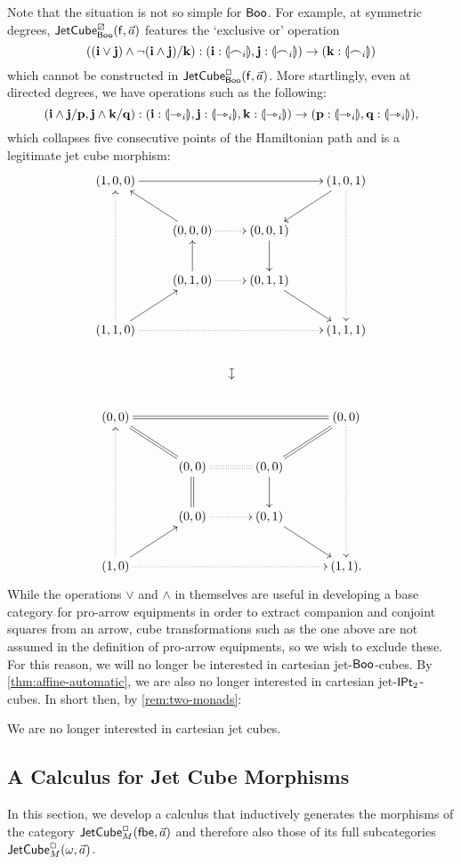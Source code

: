 \documentclass[a4paper]{memoir}
\begin{document}
Note that the situation is not so simple for $\mathsf{Boo}$.
For example, at symmetric degrees, $\mathsf{JetCube}^{\boxslash}_{\mathsf{Boo}}\mathopen{}\left( {\mathsf{f}},\vec a \right)\mathclose{}$ features the `exclusive or' operation
\[
	((\mathbf{i} \vee \mathbf{j}) \wedge \lnot(\mathbf{i} \wedge \mathbf{j})/\mathbf{k}) : (\mathbf{i} : {\llparenthesis \frown_i \rrparenthesis}, \mathbf{j} : {\llparenthesis \frown_i \rrparenthesis}) \to (\mathbf{k} : {\llparenthesis \frown_i \rrparenthesis})
\]
which cannot be constructed in $\mathsf{JetCube}^{\Box}_{\mathsf{Boo}}\mathopen{}\left( {\mathsf{f}},\vec a \right)\mathclose{}$.
More startlingly, even at directed degrees, we have operations such as the following:
\[
	(\mathbf{i} \wedge \mathbf{j}/\mathbf{p}, \mathbf{j} \wedge \mathbf{k}/\mathbf{q}) : (\mathbf{i} : {\llparenthesis \rightarrowtriangle_i \rrparenthesis}, \mathbf{j} : {\llparenthesis \rightarrowtriangle_i \rrparenthesis}, \mathbf{k} : {\llparenthesis \rightarrowtriangle_i \rrparenthesis}) \to (\mathbf{p} : {\llparenthesis \rightarrowtriangle_i \rrparenthesis}, \mathbf{q} : {\llparenthesis \rightarrowtriangle_i \rrparenthesis}),
\]
which collapses five consecutive points of the Hamiltonian path and is a legitimate jet cube morphism:
\[
	\xymatrix{
		(1, 0, 0)
			\ar[rrr]
		&&& (1, 0, 1)
			\ar[ld]
			\ar@{.>}[ddd]
		\\
		& (0, 0, 0)
			\ar[lu]
			\ar@{.>}[r]
		& (0, 0, 1)
			\ar[d]
		\\
		& (0, 1, 0)
			\ar[u]
			\ar@{.>}[r]
		& (0, 1, 1)
			\ar[rd]
		\\
		(1, 1, 0)
			\ar[ru]
			\ar@{.>}[uuu]
			\ar@{.>}[rrr]
			\ar@{}[rrrdd]|{\rotatebox{270}{$\mapsto$}}
		&&& (1, 1, 1)
		\\
		\\
		(0, 0)
			\ar@{=}[rrr]
		&&& (0, 0)
			\ar@{=}[ld]
			\ar@{.>}[ddd]
		\\
		& (0, 0)
			\ar@{=}[lu]
			\ar@{:}[r]
		& (0, 0)
			\ar[d]
		\\
		& (0, 0)
			\ar@{=}[u]
			\ar@{.>}[r]
		& (0, 1)
			\ar[rd]
		\\
		(1, 0)
			\ar[ru]
			\ar@{.>}[uuu]
			\ar@{.>}[rrr]
		&&& (1, 1).
	}
\]
While the operations $\vee$ and $\wedge$ in themselves are useful in developing a base category for pro-arrow equipments in order to extract companion and conjoint squares from an arrow, cube transformations such as the one above are not assumed in the definition of pro-arrow equipments, so we wish to exclude these.
For this reason, we will no longer be interested in cartesian jet-$\mathsf{Boo}$-cubes.
By \cref{thm:affine-automatic}, we are also no longer interested in cartesian jet-${\mathsf{IPt}_2}$-cubes.
In short then, by \cref{rem:two-monads}:
\begin{remark} \label{rem:no-cartesian}
	We are no longer interested in cartesian jet cubes.
\end{remark}

\subsection{A Calculus for Jet Cube Morphisms} \label{sec:jetcubes:calculus}
In this section, we develop a calculus that inductively generates the morphisms of the category \allowbreak $\mathsf{JetCube}^{\Box}_{M}\mathopen{}\left( {\mathsf{fbe}},\vec a \right)\mathclose{}$ and therefore also those of its full subcategories $\mathsf{JetCube}^{\Box}_{M}\mathopen{}\left( \omega,\vec a \right)\mathclose{}$.
\end{document}
